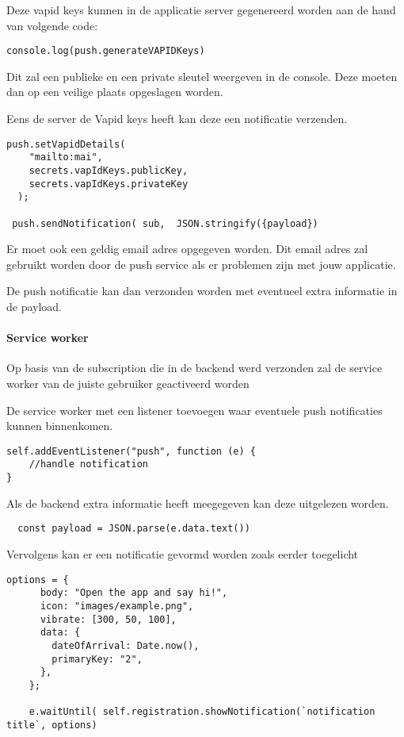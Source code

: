 		
			Deze vapid keys kunnen in de applicatie server gegenereerd worden aan de hand van volgende code:
			
\begin{lstlisting}
console.log(push.generateVAPIDKeys)
\end{lstlisting}

			Dit zal een publieke en een private sleutel weergeven in de console. Deze moeten dan op een veilige plaats opgeslagen worden.
			
			Eens de server de Vapid keys heeft kan deze een notificatie verzenden.
			
\begin{lstlisting}
push.setVapidDetails(
    "mailto:mai",
    secrets.vapIdKeys.publicKey,
    secrets.vapIdKeys.privateKey
  );
  
 push.sendNotification( sub,  JSON.stringify({payload})
\end{lstlisting}

			Er moet ook een geldig email adres opgegeven worden. Dit email adres zal gebruikt worden door de push service als er problemen zijn met jouw applicatie.
			
			De push notificatie kan dan verzonden worden met eventueel extra informatie in de payload.
			
		\paragraph{Service worker}
		
			Op basis van de subscription die in de backend werd verzonden zal de service worker van de juiste gebruiker geactiveerd worden
			
			De service worker met een listener toevoegen waar eventuele push notificaties kunnen binnenkomen.
			
\begin{lstlisting}
self.addEventListener("push", function (e) {
	//handle notification
}
\end{lstlisting}
			
			Als de backend extra informatie heeft meegegeven kan deze uitgelezen worden.
\begin{lstlisting}
  const payload = JSON.parse(e.data.text())
\end{lstlisting}
			
			Vervolgens kan er een notificatie gevormd worden zoals eerder toegelicht
			
\begin{lstlisting}
options = {
      body: "Open the app and say hi!",
      icon: "images/example.png",
      vibrate: [300, 50, 100],
      data: {
        dateOfArrival: Date.now(),
        primaryKey: "2",
      },
    };

    e.waitUntil( self.registration.showNotification(`notification title`, options)
\end{lstlisting}
			
